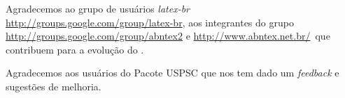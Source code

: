 \begin{agradecimentos}
	Agradecemos ao grupo de usu\'arios
	\emph{latex-br}  {\url{http://groups.google.com/group/latex-br}}, aos integrantes do grupo
	\emph{\abnTeX}  {\url{http://groups.google.com/group/abntex2}  e \url{http://www.abntex.net.br/}}~que contribuem para a evolução do \abnTeX.
	
	Agradecemos aos usu\'arios do Pacote USPSC que nos tem dado um \textit{feedback} e sugestões de melhoria. 
	
\end{agradecimentos}
